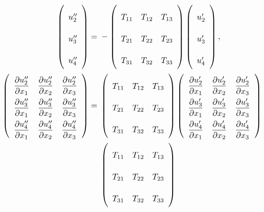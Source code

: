 \documentclass[a4paper,12pt,dvips]{article}
\begin{document}
\begin{align}
\begin{aligned}
  \left(\begin{array}{c}
    u''_2 \\ u''_3 \\ u''_4
  \end{array}\right)
  = &\;
 -\left(\begin{array}{ccc}
    T_{11} & T_{12} & T_{13} \\
    T_{21} & T_{22} & T_{23} \\
    T_{31} & T_{32} & T_{33}
  \end{array}\right)
  \left(\begin{array}{c}
    u'_2 \\ u'_3 \\ u'_4
  \end{array}\right),
  \\
  \renewcommand{\arraystretch}{2.2}
  \left(\begin{array}{ccc}
    \dfrac{\partial u''_2}{\partial x_1} &
    \dfrac{\partial u''_2}{\partial x_2} &
    \dfrac{\partial u''_2}{\partial x_3} \\
    \dfrac{\partial u''_3}{\partial x_1} &
    \dfrac{\partial u''_3}{\partial x_2} &
    \dfrac{\partial u''_3}{\partial x_3} \\
    \dfrac{\partial u''_4}{\partial x_1} &
    \dfrac{\partial u''_4}{\partial x_2} &
    \dfrac{\partial u''_4}{\partial x_3}
  \end{array}\right)
  = &\;
  \renewcommand{\arraystretch}{2.2}
  \left(\begin{array}{ccc}
    T_{11} & T_{12} & T_{13} \\
    T_{21} & T_{22} & T_{23} \\
    T_{31} & T_{32} & T_{33}
  \end{array}\right)
  \left(\begin{array}{ccc}
    \dfrac{\partial u'_2}{\partial x_1} &
    \dfrac{\partial u'_2}{\partial x_2} &
    \dfrac{\partial u'_2}{\partial x_3} \\
    \dfrac{\partial u'_3}{\partial x_1} &
    \dfrac{\partial u'_3}{\partial x_2} &
    \dfrac{\partial u'_3}{\partial x_3} \\
    \dfrac{\partial u'_4}{\partial x_1} &
    \dfrac{\partial u'_4}{\partial x_2} &
    \dfrac{\partial u'_4}{\partial x_3}
  \end{array}\right)
  \\ &\;
  \renewcommand{\arraystretch}{2.2}
  \left(\begin{array}{ccc}
    T_{11} & T_{12} & T_{13} \\
    T_{21} & T_{22} & T_{23} \\
    T_{31} & T_{32} & T_{33}
  \end{array}\right)
\end{aligned}
\label{e:treat:euler3d:vec}
\end{align}
\end{document}

